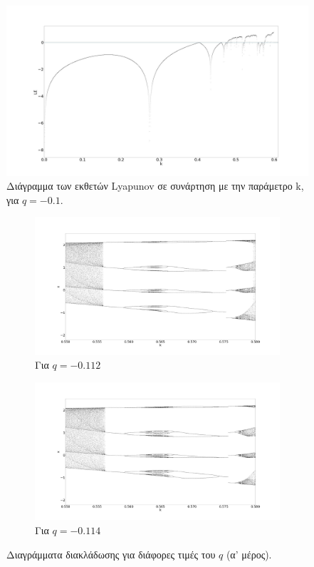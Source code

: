 \begin{figure}[ht]
	\centering
	\includegraphics[width=1\linewidth]{LateX images/graphs/g2}
	\caption{Διάγραμμα των εκθετών Lyapunov σε συνάρτηση με την παράμετρο k, για $q=-0.1$.}
	\label{f:g7}
\end{figure}


\begin{figure}[ht]
	\centering
	
	\begin{subfigure}[b]{1\textwidth}
		\centering
		\includegraphics[width=\textwidth]{LateX images/graphs/g3}
		\caption{Για $q=-0.112$}
		\label{f:g3}
	\end{subfigure}
	\hfill
	\begin{subfigure}[b]{1\textwidth}
		\centering
		\includegraphics[width=\textwidth]{LateX images/graphs/g4}
		\caption{Για $q=-0.114$}
		\label{f:g4}
	\end{subfigure}
	\hfill
	\caption{Διαγράμματα διακλάδωσης για διάφορες τιμές του $q$ (α' μέρος). }
	\label{f:g211}
\end{figure}

